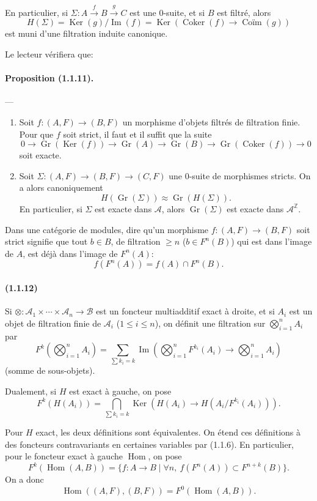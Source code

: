 \documentclass[10pt]{article}
\newcommand{\Z}{\mathbb Z}
\newcommand{\Gr}{\operatorname{Gr}}
\newcommand{\Ker}{\operatorname{Ker}}
\newcommand{\Coker}{\operatorname{Coker}}
\newcommand{\Imop}{\operatorname{Im}}
\newcommand{\Hom}{\operatorname{Hom}}
\newcommand{\calA}{\mathcal A}
\newcommand{\calB}{\mathcal B}
\begin{document}
En particulier, si $\Sigma:A\xrightarrow{f}B\xrightarrow{g}C$ est une $0$-suite, et si $B$ est filtré, alors
\[
H(\Sigma)=\Ker(g)/\Imop(f)=\Ker(\Coker(f)\to\operatorname{Coïm}(g))
\]
est muni d'une filtration induite canonique.

Le lecteur vérifiera que:

\paragraph{Proposition (1.1.11).} --- \begin{enumerate}[label=(\roman*)]
\item Soit $f:(A,F)\to(B,F)$ un morphisme d'objets filtrés de filtration finie. Pour que $f$ soit strict, il faut et il suffit que la suite
\[
0\to\Gr(\Ker(f))\to\Gr(A)\to\Gr(B)\to\Gr(\Coker(f))\to0
\]
soit exacte.
\item Soit $\Sigma:(A,F)\to(B,F)\to(C,F)$ une $0$-suite de morphismes stricts. On a alors canoniquement
\[
H(\Gr(\Sigma))\approx\Gr(H(\Sigma)).
\]
En particulier, si $\Sigma$ est exacte dans $\calA$, alors $\Gr(\Sigma)$ est exacte dans $\calA^{\Z}$.
\end{enumerate}

Dans une catégorie de modules, dire qu'un morphisme $f:(A,F)\to(B,F)$ soit strict signifie que tout $b\in B$, de filtration $\ge n$ ($b\in F^n(B)$) qui est dans l'image de $A$, est déjà dans l'image de $F^n(A)$:
\[
f(F^n(A))=f(A)\cap F^n(B).
\]

\paragraph{(1.1.12)} Si $\otimes:\calA_1\times\cdots\times\calA_n\to\calB$ est un foncteur multiadditif exact à droite, et si $A_i$ est un objet de filtration finie de $\calA_i$ ($1\le i\le n$), on définit une filtration sur $\bigotimes_{i=1}^nA_i$ par
\[
F^k\left(\bigotimes_{i=1}^n A_i\right)=\sum_{\sum k_i=k}\Imop\left(\bigotimes_{i=1}^n F^{k_i}(A_i)\to\bigotimes_{i=1}^n A_i\right)
\]
(somme de sous-objets).

Dualement, si $H$ est exact à gauche, on pose
\[
F^k(H(A_i))=\bigcap_{\sum k_i=k}\Ker\left(H(A_i)\to H(A_i/F^{k_i}(A_i))\right).
\]

Pour $H$ exact, les deux définitions sont équivalentes. On étend ces définitions à des foncteurs contravariants en certaines variables par (1.1.6). En particulier, pour le foncteur exact à gauche $\Hom$, on pose
\[
F^k(\Hom(A,B))=\{f:A\to B\mid \forall n,\ f(F^n(A))\subset F^{n+k}(B)\}.
\]
On a donc
\[
\Hom((A,F),(B,F))=F^0(\Hom(A,B)).
\]
\end{document}
